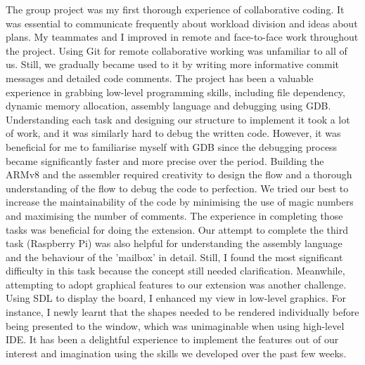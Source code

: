 \documentclass{article}
\begin{document}
The group project was my first thorough experience of collaborative coding. It was essential to communicate frequently about workload division and ideas about plans. My teammates and I improved in remote and face-to-face work throughout the project. Using Git for remote collaborative working was unfamiliar to all of us. Still, we gradually became used to it by writing more informative commit messages and detailed code comments. The project has been a valuable experience in grabbing low-level programming skills, including file dependency, dynamic memory allocation, assembly language and debugging using GDB. Understanding each task and designing our structure to implement it took a lot of work, and it was similarly hard to debug the written code. However, it was beneficial for me to familiarise myself with GDB since the debugging process became significantly faster and more precise over the period. Building the ARMv8 and the assembler required creativity to design the flow and a thorough understanding of the flow to debug the code to perfection. We tried our best to increase the maintainability of the code by minimising the use of magic numbers and maximising the number of comments. The experience in completing those tasks was beneficial for doing the extension. Our attempt to complete the third task (Raspberry Pi) was also helpful for understanding the assembly language and the behaviour of the 'mailbox' in detail. Still, I found the most significant difficulty in this task because the concept still needed clarification. Meanwhile, attempting to adopt graphical features to our extension was another challenge. Using SDL to display the board, I enhanced my view in low-level graphics. For instance, I newly learnt that the shapes needed to be rendered individually before being presented to the window, which was unimaginable when using high-level IDE. It has been a delightful experience to implement the features out of our interest and imagination using the skills we developed over the past few weeks. 
\end{document}
